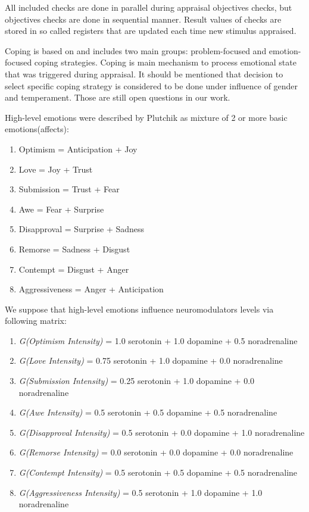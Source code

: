 All included checks are done in parallel during appraisal objectives checks, but objectives checks are done in sequential manner.
Result values of checks are stored in so called registers that are updated each time new stimulus appraised.

Coping is based on \cite{dont_worry_be_happy} and includes two main groups: problem-focused and emotion-focused coping strategies. Coping is main mechanism to process emotional state that was triggered during appraisal. It should be mentioned that decision to select specific coping strategy is considered to be done under influence of gender and temperament. Those are still open questions in our work.

High-level emotions were described by Plutchik \cite{natureofemotions} as mixture of 2 or more basic emotions(affects):

\begin{enumerate}
	\item  Optimism = Anticipation + Joy
	\item  Love = Joy + Trust
	\item  Submission = Trust + Fear
	\item  Awe = Fear + Surprise
	\item  Disapproval = Surprise + Sadness
	\item  Remorse = Sadness + Disgust
	\item  Contempt = Disgust + Anger
	\item  Aggressiveness =	Anger + Anticipation
\end{enumerate}

We suppose that high-level emotions influence neuromodulators levels via following matrix:

\begin{enumerate}
	\item  \emph{G(Optimism Intensity)} = 1.0 serotonin  + 1.0 dopamine + 0.5 noradrenaline
	\item  \emph{G(Love Intensity)} = 0.75 serotonin + 1.0 dopamine + 0.0 noradrenaline
	\item  \emph{G(Submission Intensity)} = 0.25 serotonin + 1.0 dopamine + 0.0 noradrenaline
	\item  \emph{G(Awe Intensity)} = 0.5 serotonin + 0.5 dopamine + 0.5 noradrenaline
	\item  \emph{G(Disapproval Intensity)} = 0.5 serotonin + 0.0 dopamine + 1.0 noradrenaline
	\item  \emph{G(Remorse Intensity)} = 0.0 serotonin + 0.0 dopamine + 0.0 noradrenaline
	\item  \emph{G(Contempt Intensity)} = 0.5 serotonin + 0.5 dopamine + 0.5 noradrenaline
	\item  \emph{G(Aggressiveness Intensity)} = 0.5 serotonin + 1.0 dopamine + 1.0 noradrenaline
\end{enumerate}

